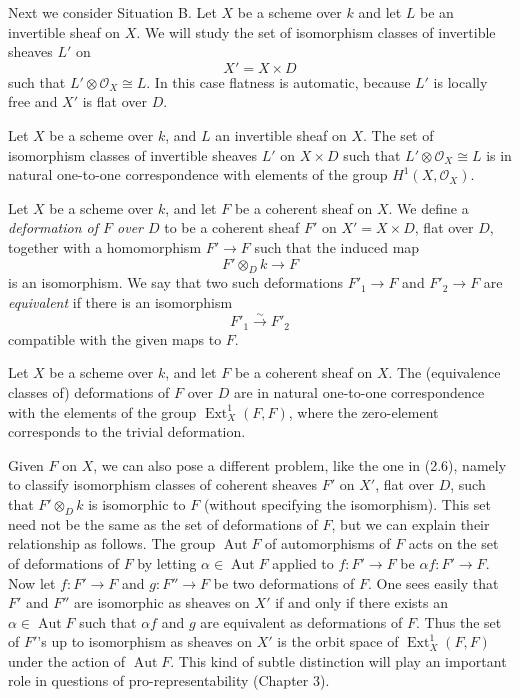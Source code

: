 Next we consider Situation B. Let $X$ be a
scheme over $k$ and let $L$ be an invertible
sheaf on $X$. We will study the set of
isomorphism classes of invertible sheaves
$L'$ on
$$
X'=X\times D
$$
such that $L'\otimes\mathcal{O}_X\cong L$.
In this case flatness is automatic, because
$L'$ is locally free and $X'$ is flat over
$D$.

\begin{proposition}
\label{proposition-line-bundle-first-order}
Let $X$ be a scheme over $k$, and $L$ an
invertible sheaf on $X$. The set of
isomorphism classes of invertible sheaves
$L'$ on $X\times D$ such that
$L'\otimes\mathcal{O}_X\cong L$ is in natural
one-to-one correspondence with elements of
the group $H^1(X,\mathcal{O}_X)$.
\end{proposition}

\begin{definition}
\label{definition-coherent-first-order}
Let $X$ be a scheme over $k$, and let $F$ be
a coherent sheaf on $X$. We define a
\emph{deformation of $F$ over $D$} to be a
coherent sheaf $F'$ on $X'=X\times D$, flat
over $D$, together with a homomorphism
$F'\to F$ such that the induced map
$$
F'\otimes_D k\longrightarrow F
$$
is an isomorphism. We say that two such
deformations $F'_1\to F$ and $F'_2\to F$ are
\emph{equivalent} if there is an isomorphism
$$
F'_1\xrightarrow{\sim}F'_2
$$
compatible with the given maps to $F$.
\end{definition}

\begin{theorem}
\label{theorem-coherent-first-order}
Let $X$ be a scheme over $k$, and let $F$ be
a coherent sheaf on $X$. The (equivalence
classes of) deformations of $F$ over $D$ are
in natural one-to-one correspondence with
the elements of the group
$\operatorname{Ext}^1_X(F,F)$, where the
zero-element corresponds to the trivial
deformation.
\end{theorem}

\begin{remark}
\label{remark-unmarked-coherent-first-order}
Given $F$ on $X$, we can also pose a
different problem, like the one in (2.6),
namely to classify isomorphism classes of
coherent sheaves $F'$ on $X'$, flat over
$D$, such that $F'\otimes_D k$ is isomorphic
to $F$ (without specifying the isomorphism).
This set need not be the same as the set of
deformations of $F$, but we can explain
their relationship as follows. The group
$\operatorname{Aut}F$ of automorphisms of
$F$ acts on the set of deformations of $F$
by letting $\alpha\in\operatorname{Aut}F$
applied to $f:F'\to F$ be
$\alpha f:F'\to F$. Now let $f:F'\to F$ and
$g:F''\to F$ be two deformations of $F$. One
sees easily that $F'$ and $F''$ are
isomorphic as sheaves on $X'$ if and only if
there exists an
$\alpha\in\operatorname{Aut}F$ such that
$\alpha f$ and $g$ are equivalent as
deformations of $F$. Thus the set of $F'$'s
up to isomorphism as sheaves on $X'$ is the
orbit space of $\operatorname{Ext}^1_X(F,F)$
under the action of $\operatorname{Aut}F$.
This kind of subtle distinction will play an
important role in questions of
pro-representability (Chapter 3).
\end{remark}

